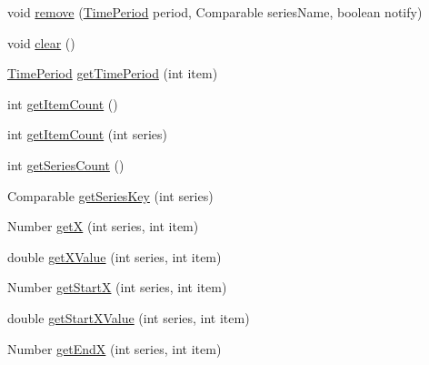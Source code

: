 \begin{DoxyCompactItemize}
\item 
void \mbox{\hyperlink{classorg_1_1jfree_1_1data_1_1time_1_1_time_table_x_y_dataset_a186750aa0c3fea5e93a4bd05bea01f6c}{remove}} (\mbox{\hyperlink{interfaceorg_1_1jfree_1_1data_1_1time_1_1_time_period}{Time\+Period}} period, Comparable series\+Name, boolean notify)
\item 
void \mbox{\hyperlink{classorg_1_1jfree_1_1data_1_1time_1_1_time_table_x_y_dataset_a1d787e37964ddff8d9d2803d984a86d4}{clear}} ()
\item 
\mbox{\hyperlink{interfaceorg_1_1jfree_1_1data_1_1time_1_1_time_period}{Time\+Period}} \mbox{\hyperlink{classorg_1_1jfree_1_1data_1_1time_1_1_time_table_x_y_dataset_add6786f453d98f7a24ab89a5c9e65e7d}{get\+Time\+Period}} (int item)
\item 
int \mbox{\hyperlink{classorg_1_1jfree_1_1data_1_1time_1_1_time_table_x_y_dataset_ad80a7fca84f962b49d80b1c1f4f745a4}{get\+Item\+Count}} ()
\item 
int \mbox{\hyperlink{classorg_1_1jfree_1_1data_1_1time_1_1_time_table_x_y_dataset_a28caf1b2b3803db97d1b4548a7f26d42}{get\+Item\+Count}} (int series)
\item 
int \mbox{\hyperlink{classorg_1_1jfree_1_1data_1_1time_1_1_time_table_x_y_dataset_a51ec8920b7c12d2f8bcc8cd53e71b452}{get\+Series\+Count}} ()
\item 
Comparable \mbox{\hyperlink{classorg_1_1jfree_1_1data_1_1time_1_1_time_table_x_y_dataset_ada264bb4617f16122facd70f37cb4c46}{get\+Series\+Key}} (int series)
\item 
Number \mbox{\hyperlink{classorg_1_1jfree_1_1data_1_1time_1_1_time_table_x_y_dataset_a5b64bfd810fe031ffaded80c28a6c345}{getX}} (int series, int item)
\item 
double \mbox{\hyperlink{classorg_1_1jfree_1_1data_1_1time_1_1_time_table_x_y_dataset_a74bc9da96ff2a538f8753d2abc2588b0}{get\+X\+Value}} (int series, int item)
\item 
Number \mbox{\hyperlink{classorg_1_1jfree_1_1data_1_1time_1_1_time_table_x_y_dataset_a9af3bf40e3d723b5aad9470417154183}{get\+StartX}} (int series, int item)
\item 
double \mbox{\hyperlink{classorg_1_1jfree_1_1data_1_1time_1_1_time_table_x_y_dataset_a0173db781cf6ea359c9937b4bbac4dd1}{get\+Start\+X\+Value}} (int series, int item)
\item 
Number \mbox{\hyperlink{classorg_1_1jfree_1_1data_1_1time_1_1_time_table_x_y_dataset_abc416a9ea2a52c7412141e7f0f15bd6a}{get\+EndX}} (int series, int item)
\item 

\end{DoxyCompactItemize}
